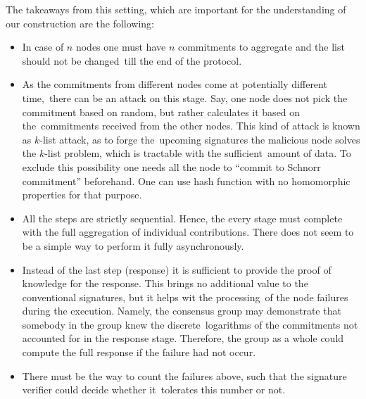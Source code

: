 The takeaways from this setting, which are important for the understanding of our construction are the following:
\begin{itemize}
    \item In case of $n$ nodes one must have $n$ commitments to aggregate and the list should not be changed\
    till the end of the protocol.
    \item As the commitments from different nodes come at potentially different time,\
    there can be an attack on this stage.
    Say, one node does not pick the commitment based on random, but rather calculates it based on the\
    commitments received from the other nodes.
    This kind of attack is known as $k$-list attack, as to forge the\
    upcoming signatures the malicious node solves the $k$-list problem, which is tractable with the sufficient\
    amount of data.
    To exclude this possibility one needs all the node to \enquote{commit to Schnorr commitment} beforehand.
    One can use hash function with no homomorphic properties for that purpose.
    \item All the steps are strictly sequential.
    Hence, the every stage must complete with the full aggregation of
    individual contributions.
    There does not seem to be a simple way to perform it fully asynchronously.
    \item Instead of the last step (response) it is sufficient to provide the proof of knowledge for the response.
    This brings no additional value to the conventional signatures, but it helps wit the processing\
    of the node failures during the execution.
    Namely, the consensus group may demonstrate that somebody in the group knew the discrete\
    logarithms of the commitments not accounted for in the response stage.
    Therefore, the group as a whole could
    compute the full response if the failure had not occur.
    \item There must be the way to count the failures above, such that the signature verifier could decide whether it\
    tolerates this number or not.
\end{itemize}

